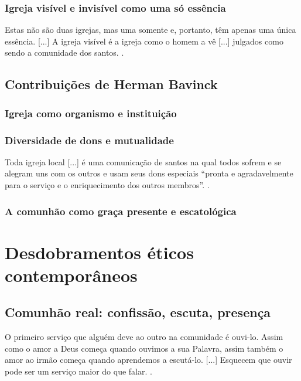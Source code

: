 \subsubsection{Igreja visível e invisível como uma só essência}
\begin{citacao}
Estas não são duas igrejas, mas uma somente e, portanto, têm apenas uma única essência. [...] A igreja visível é a igreja como o homem a vê [...] julgados como sendo a comunidade dos santos. \cite[p. 642]{berkhof2012}.
\end{citacao}

\subsection{Contribuições de Herman Bavinck}

\subsubsection{Igreja como organismo e instituição}

\subsubsection{Diversidade de dons e mutualidade}
\begin{citacao}
Toda igreja local [...] é uma comunicação de santos na qual todos sofrem e se alegram uns com os outros e usam seus dons especiais ``pronta e agradavelmente para o serviço e o enriquecimento dos outros membros''. \cite[p. 380]{bavinck2012}.
\end{citacao}

\subsubsection{A comunhão como graça presente e escatológica}

\section{Desdobramentos éticos contemporâneos}

\subsection{Comunhão real: confissão, escuta, presença}
\begin{citacao}
O primeiro serviço que alguém deve ao outro na comunidade é ouvi-lo. Assim como o amor a Deus começa quando ouvimos a sua Palavra, assim também o amor ao irmão começa quando aprendemos a escutá-lo. [...] Esquecem que ouvir pode ser um serviço maior do que falar. \cite[pp. 75--76]{bonhoeffer1997}.
\end{citacao}

